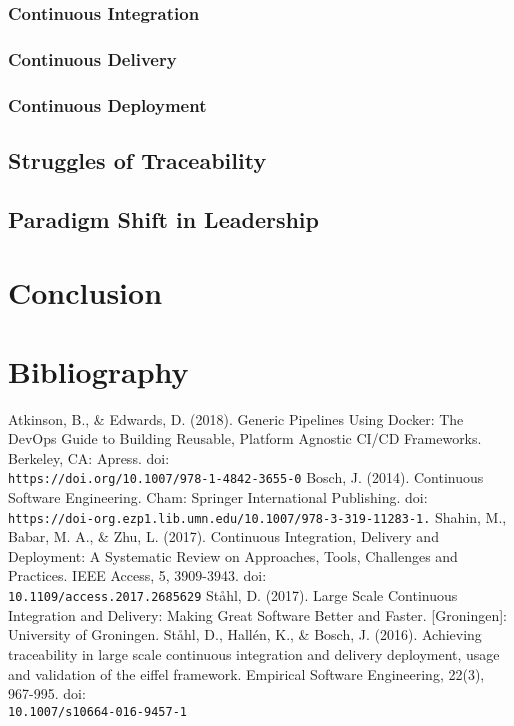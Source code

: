 \documentclass[11pt,a4paper]{article}
\begin{document}
		\subsubsection{Continuous Integration}
		\subsubsection{Continuous Delivery}
		\subsubsection{Continuous Deployment}
	\subsection{Struggles of Traceability}
	\subsection{Paradigm Shift in Leadership}

\section{Conclusion}

\section{Bibliography}
\begin{thebibliography}{6}
	 Atkinson, B., \& Edwards, D. (2018). Generic Pipelines Using Docker: The DevOps Guide to Building Reusable, Platform Agnostic CI/CD Frameworks. Berkeley, CA: Apress. doi:\\\texttt{https://doi.org/10.1007/978-1-4842-3655-0}
	 Bosch, J. (2014). Continuous Software Engineering. Cham: Springer International Publishing. doi:\\\texttt{https://doi-org.ezp1.lib.umn.edu/10.1007/978-3-319-11283-1.}
	 Shahin, M., Babar, M. A., \& Zhu, L. (2017). Continuous Integration, Delivery and Deployment: A Systematic Review on Approaches, Tools, Challenges and Practices. IEEE Access, 5, 3909-3943. doi:\\\texttt{10.1109/access.2017.2685629}
	 St\aa hl, D. (2017). Large Scale Continuous Integration and Delivery: Making Great Software Better and Faster. [Groningen]: University of Groningen.
	 St\aa hl, D., Hall\'{e}n, K., \& Bosch, J. (2016). Achieving traceability in large scale continuous integration and delivery deployment, usage and validation of the eiffel framework. Empirical Software Engineering, 22(3), 967-995. doi:\\\texttt{10.1007/s10664-016-9457-1}
\end{thebibliography}
\end{document}
